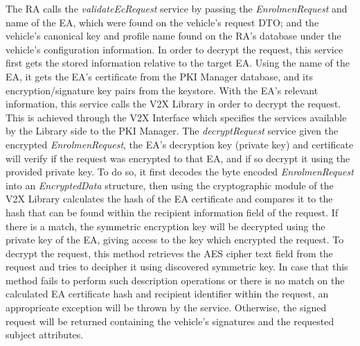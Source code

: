 The RA calls the \textit{validateEcRequest} service by passing the \textit{EnrolmenRequest} and name of the EA, which were found on the vehicle's request DTO; and the vehicle's canonical key and profile name found on the RA's database under the vehicle's configuration information. In order to decrypt the request, this service first gets the stored information relative to the target EA. Using the name of the EA, it gets the EA's certificate from the PKI Manager database, and its encryption/signature key pairs from the keystore. With the EA's relevant information, this service calls the V2X Library in order to decrypt the request. This is achieved through the V2X Interface which specifies the services available by the Library side to the PKI Manager. The \textit{decryptRequest} service given the encrypted \textit{EnrolmenRequest}, the EA's decryption key (private key) and certificate will verify if the request was encrypted to that EA, and if so decrypt it using the provided private key. To do so, it first decodes the byte encoded \textit{EnrolmenRequest} into an \textit{EncryptedData} structure, then using the cryptographic module of the V2X Library calculates the hash of the EA certificate and compares it to the hash that can be found within the recipient information field of the request. If there is a match, the symmetric encryption key will be decrypted using the private key of the EA, giving access to the key which encrypted the request. To decrypt the request, this method retrieves the AES cipher text field from the request and tries to decipher it using discovered symmetric key. In case that this method fails to perform such description operations or there is no match on the calculated EA certificate hash and recipient identifier within the request, an approprieate exception will be thrown by the service. Otherwise, the signed request will be returned containing the vehicle's signatures and the requested subject attributes.


